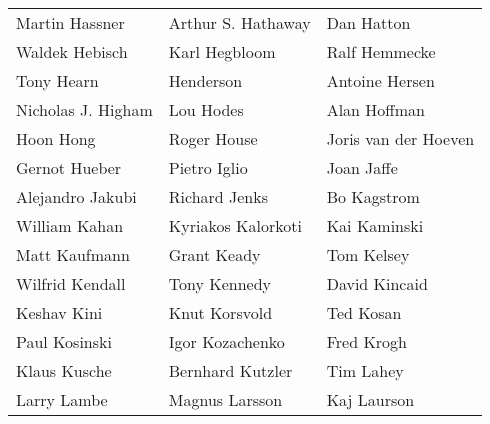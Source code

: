 \begin{tabular}{lll}
Martin Hassner         & Arthur S. Hathaway     & Dan Hatton\\
Waldek Hebisch         & Karl Hegbloom          & Ralf Hemmecke\\
Tony Hearn             & Henderson              & Antoine Hersen\\
Nicholas J. Higham     & Lou Hodes              & Alan Hoffman\\
Hoon Hong              & Roger House            & Joris van der Hoeven\\
Gernot Hueber          & Pietro Iglio           & Joan Jaffe\\
Alejandro Jakubi       & Richard Jenks          & Bo Kagstrom\\
William Kahan          & Kyriakos Kalorkoti     & Kai Kaminski\\
Matt Kaufmann          & Grant Keady            & Tom Kelsey\\
Wilfrid Kendall        & Tony Kennedy           & David Kincaid\\
Keshav Kini            & Knut Korsvold          & Ted Kosan\\
Paul Kosinski          & Igor Kozachenko        & Fred Krogh\\
Klaus Kusche           & Bernhard Kutzler       & Tim Lahey\\
Larry Lambe            & Magnus Larsson         & Kaj Laurson\\
\end{tabular}
\vfill
\newpage
